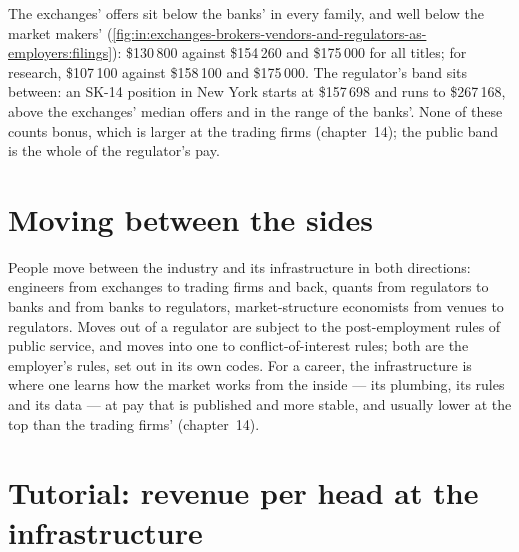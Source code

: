 The exchanges' offers sit below the banks' in every family, and well below the market makers'
(\cref{fig:in:exchanges-brokers-vendors-and-regulators-as-employers:filings}): \$130\,800 against \$154\,260 and
\$175\,000 for all titles; for research, \$107\,100 against \$158\,100 and \$175\,000. The regulator's band sits between:
an SK-14 position in New York starts at \$157\,698 and runs to \$267\,168, above the exchanges' median offers and in
the range of the banks'. None of these counts bonus, which is larger at the trading firms (chapter~14); the public band
is the whole of the regulator's pay.

\section{Moving between the sides}

People move between the industry and its infrastructure in both directions: engineers from exchanges to trading firms
and back, quants from regulators to banks and from banks to regulators, market-structure economists from venues to
regulators. Moves out of a regulator are subject to the post-employment rules of public service, and moves into one to
conflict-of-interest rules; both are the employer's rules, set out in its own codes. For a career, the infrastructure is
where one learns how the market works from the inside --- its plumbing, its rules and its data --- at pay that is
published and more stable, and usually lower at the top than the trading firms' (chapter~14).

\section{Tutorial: revenue per head at the infrastructure}\label{tut:in:exchanges-brokers-vendors-and-regulators-as-employers:tut}

